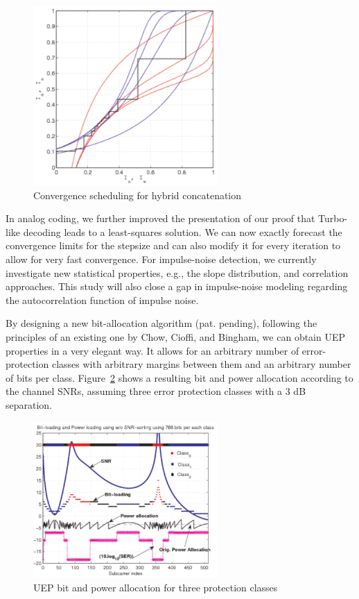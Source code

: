 \begin{figure}[ht]
  \centering
  \includegraphics[width=7cm]{henkel_1}
 \caption{Convergence scheduling for hybrid concatenation}
  \label{fig:henkel_1}
\end{figure}

In analog coding, we further improved the presentation of our proof that
Turbo-like decoding leads to a least-squares solution. We can now exactly
forecast the convergence limits for the stepsize and can also
modify it for every iteration to allow for very fast
convergence. For impulse-noise detection, we currently investigate new
statistical properties, e.g., the slope distribution, and correlation
approaches. This study will also close a gap in impulse-noise modeling
regarding the autocorrelation function of impulse noise.

By designing a new bit-allocation algorithm (pat. pending), following the
principles of an existing one by Chow, Cioffi, and Bingham, we can obtain UEP
properties in a very elegant way. It allows for an arbitrary number of
error-protection classes with arbitrary margins between them and an arbitrary
number of bits per class. Figure~\ref{fig:henkel_2} shows a resulting bit and
power allocation according to the channel SNRs, assuming three error protection
classes with a 3 dB separation.


\begin{figure}[ht]
  \centering
  \includegraphics[width=7cm]{henkel_2}
  \caption{UEP bit and power allocation for three protection classes}
  \label{fig:henkel_2}
\end{figure}

